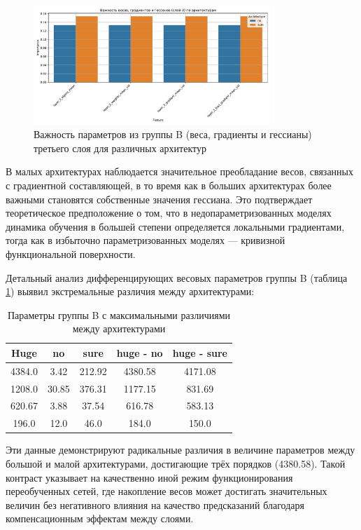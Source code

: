 \documentclass[a4paper,12pt]{article}
\begin{document}
\begin{figure}[ht]
  \centering
  \includegraphics[width=0.8\textwidth]{resources/feature_importance_layer3.pdf}
  \caption{Важность параметров из группы B (веса, градиенты и гессианы) третьего слоя для различных архитектур}
  \label{fig:feature_importance}
\end{figure}

В малых архитектурах наблюдается значительное преобладание весов, связанных с градиентной составляющей, в то
время как в больших архитектурах более важными становятся собственные значения гессиана. Это подтверждает
теоретическое предположение о том, что в недопараметризованных моделях динамика обучения в большей степени
определяется локальными градиентами, тогда как в избыточно параметризованных моделях --- кривизной
функциональной поверхности.

Детальный анализ дифференцирующих весовых параметров группы B (таблица \ref{tab:weight_diff}) выявил
экстремальные различия между архитектурами:

\begin{table}[ht]
  \centering
  \label{tab:weight_diff}
  \begin{tabular}{|c|c|c|c|c|}
    \hline
    \textbf{Huge} & \textbf{no} & \textbf{sure} & \textbf{huge - no} & \textbf{huge - sure} \\
    \hline
    4384.0 & 3.42 & 212.92 & 4380.58 & 4171.08 \\
    1208.0 & 30.85 & 376.31 & 1177.15 & 831.69 \\
    620.67 & 3.88 & 37.54 & 616.78 & 583.13 \\
    196.0 & 12.0 & 46.0 & 184.0 & 150.0 \\
    \hline
  \end{tabular}
  \caption{Параметры группы B с максимальными различиями между архитектурами}
\end{table}

Эти данные демонстрируют радикальные различия в величине параметров между большой и малой архитектурами,
достигающие трёх порядков (4380.58). Такой контраст указывает на качественно иной режим функционирования
переобученных сетей, где накопление весов может достигать значительных величин без негативного влияния на
качество предсказаний благодаря компенсационным эффектам между слоями.
\end{document}
